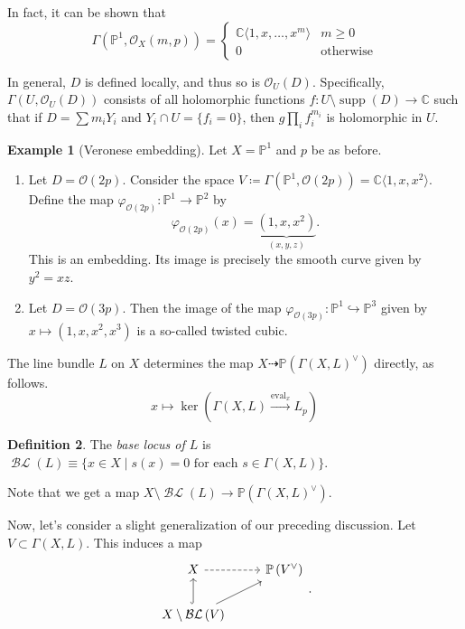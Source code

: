 \documentclass[10pt,letterpaper,cm]{nupset}
\theoremstyle{definition}
\newtheorem{defn}{Definition}[subsection]
\newtheorem{exmp}[defn]{Example}
\theoremstyle{theorem}
\theoremstyle{remark}
\newcommand{\C}{\mathbb C}
\renewcommand{\O}{\mathcal O}
\renewcommand{\P}{\mathbb P}
\newcommand{\1}{\mathbb{1}}
\newcommand{\0}{\vec 0}
\DeclareMathOperator{\supp}{supp}
\DeclareMathOperator{\ev}{eval}
\DeclareMathOperator{\BL}{\mathcal{BL}}
\newcommand{\be}{\begin{enumerate}}
\newcommand{\ee}{\end{enumerate}}
\begin{document}
In fact, it can be shown that
\[
\Gamma\left(\P^1, \O_X\left(m,p\right)\right) = \begin{cases}
\C\langle 1, x, \ldots, x^m\rangle & m \geq 0 
\\ 0 & \text{otherwise}
\end{cases}
\]

\bigskip

In general, $D$ is defined locally, and thus so is $\O_U(D)$. Specifically,
$\Gamma\left(U, \O_U\left(D\right)\right)$ consists of all holomorphic functions $f : U \setminus \supp\left(D\right) \to \C$ such that if $D = \sum m_iY_i$ and $Y_i \cap U = \{f_i =0\}$, then $g\prod_if_i^{m_i}$ is holomorphic in $U$.

\begin{exmp}[Veronese embedding]
Let $X = \P^1$ and $p$ be as before. 
\be
\item Let $D = \O(2p)$. Consider the space $V \coloneqq \Gamma\left(\P^1, \O\left(2p\right)\right) = \C\langle 1, x, x^2\rangle.$ Define the map $\varphi_{\O(2p)} : \P^1 \to \P^2$ by $$\varphi_{\O(2p)}(x) = \underbrace{\left(1, x, x^2\right)}_{\left(x,y,z\right)}.$$ This is an embedding. Its image is precisely the smooth curve given by $y^2 = xz$.
\item Let $D = \O(3p)$. Then the image of the map $\varphi_{\O(3p)} : \P^1 \hookrightarrow \P^3$ given by $x \mapsto \left(1, x, x^2, x^3\right)$ is a so-called twisted cubic.
\ee
\end{exmp}


The line bundle $L$ on $X$ determines the map $X \dashrightarrow \P\left(\Gamma\left(X, L\right)^{\vee}\right)$ directly, as follows.
\[
x\mapsto \ker\left(\Gamma\left(X, L\right) \overset{\ev_x}{\longrightarrow} L_p\right)
\]

\begin{defn}
The \textit{base locus of $L$} is $\BL\left(L\right) \equiv \{x  \in X \mid s(x) =0 \text{ for each } s\in \Gamma\left(X, L\right)\}$.
\end{defn} 

Note that we get a map $X \setminus \BL\left(L\right) \to \P\left(\Gamma\left(X, L\right)^{\vee}\right)$.

\bigskip

Now, let's consider a slight generalization of our preceding discussion. Let $V \subset \Gamma\left(X, L\right)$. This induces a map 
\[
\begin{tikzcd}
X \arrow[r, dashed]                                    & \P\left(V^{\vee}\right) \\
X\setminus\BL\left(V\right) \arrow[u, hook] \arrow[ru] &                        
\end{tikzcd}.
\]
\end{document}

